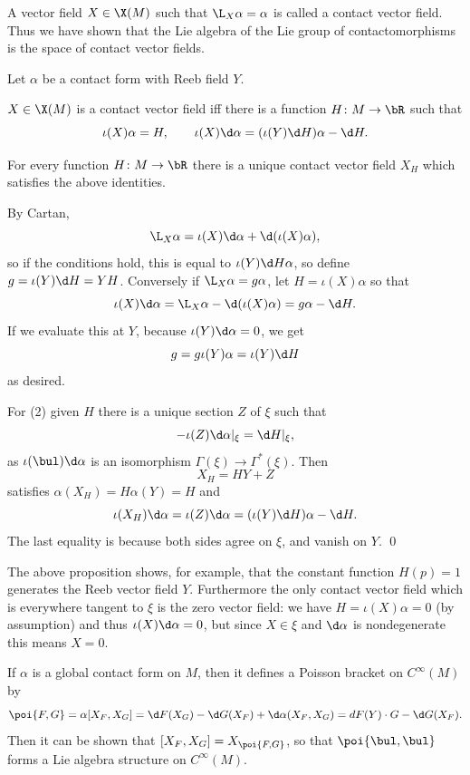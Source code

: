 A vector field $X\in\X(M)$ such that $\L_X\alpha=\alpha$ is called a {\emphcolor contact vector field}.
Thus we have shown that the Lie algebra of the Lie group of contactomorphisms is the space of contact
vector fields.

\bprop

    Let $\alpha$ be a contact form with Reeb field $Y$.
    \benum
        \item $X\in\X(M)$ is a contact vector field iff there is a function $H\colon M\to\bR$ such that
        $$ \iota(X)\alpha = H,\qquad \iota(X)\d\alpha = (\iota(Y)\d H)\alpha - \d H . $$
        \item For every function $H\colon M\to\bR$ there is a unique contact vector field $X_H$
        which satisfies the above identities.
    \eenum

\eprop

\bproof

    By Cartan,
    $$ \L_X\alpha = \iota(X)\d\alpha + \d(\iota(X)\alpha) , $$
    so if the conditions hold, this is equal to $\iota(Y)\d H\alpha$, so define $g=\iota(Y)\d H=YH$.
    Conversely if $\L_X\alpha=g\alpha$, let $H=\iota(X)\alpha$ so that
    $$ \iota(X)\d\alpha = \L_X\alpha - \d(\iota(X)\alpha) = g\alpha - \d H . $$
    If we evaluate this at $Y$, because $\iota(Y)\d\alpha=0$, we get
    $$ g = g\iota(Y)\alpha = \iota(Y)\d H $$
    as desired.

    For (2) given $H$ there is a unique section $Z$ of $\xi$ such that
    $$ -\iota(Z)\d\alpha|_\xi = \d H|_\xi , $$
    as $\iota(\bul)\d\alpha$ is an isomorphism $\Gamma(\xi)\to\Gamma^*(\xi)$.
    Then
    $$ X_H = HY + Z $$
    satisfies $\alpha(X_H)=H\alpha(Y)=H$ and
    $$ \iota(X_H)\d\alpha = \iota(Z)\d\alpha = (\iota(Y)\d H)\alpha - \d H . $$
    The last equality is because both sides agree on $\xi$, and vanish on $Y$.
    \qed

\eproof

The above proposition shows, for example, that the constant function $H(p)=1$ generates the Reeb vector field
$Y$.
Furthermore the only contact vector field which is everywhere tangent to $\xi$ is the zero vector field:
we have $H=\iota(X)\alpha=0$ (by assumption) and thus $\iota(X)\d\alpha=0$, but since $X\in\xi$ and
$\d\alpha$ is nondegenerate this means $X=0$.

\bremark

    If $\alpha$ is a global contact form on $M$, then it defines a {\emphcolor Poisson bracket} on
    $C^\infty(M)$ by
    $$ \poi{F,G} = \alpha[X_F,X_G] = \d F(X_G) - \d G(X_F) + \d\alpha(X_F,X_G) = dF(Y)\cdot G - \d G(X_F) . $$
    Then it can be shown that $[X_F,X_G]=X_{\poi{F,G}}$, so that $\poi{\bul,\bul}$ forms a Lie algebra
    structure on $C^\infty(M)$.

\eremark


